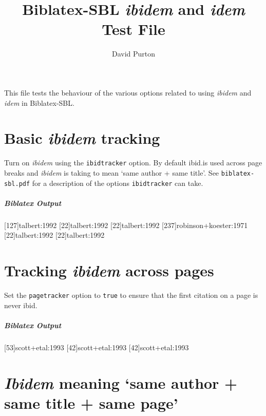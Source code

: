 \documentclass{article}
\newenvironment{biboutput}{%
  \subparagraph{Biblatex Output}
}{\color{black}}
\begin{document}
\title{Biblatex-SBL \emph{ibidem} and \emph{idem} Test File}
\author{David Purton}
\maketitle

This file tests the behaviour of the various options related to using
\emph{ibidem} and \emph{idem} in Biblatex-SBL.

\section*{Basic \emph{ibidem} tracking}

Turn on \emph{ibidem} using the \texttt{ibidtracker} option. By default
ibid.\@ is used across page breaks and \emph{ibidem} is taking to mean ‘same
author + same title’. See \texttt{biblatex-sbl.pdf} for a description of the
options \texttt{ibidtracker} can take.


\begin{biboutput}
  [127]{talbert:1992}
  [22]{talbert:1992}
  [22]{talbert:1992}
  [237]{robinson+koester:1971}
  [22]{talbert:1992}
  \clearpage
  [22]{talbert:1992}
\end{biboutput}

\section*{Tracking \emph{ibidem} across pages}

Set the \texttt{pagetracker} option to \texttt{true} to ensure that the first
citation on a page is never ibid. 


\begin{biboutput}
  [53]{scott+etal:1993}
  [42]{scott+etal:1993}
  \clearpage
  [42]{scott+etal:1993}
\end{biboutput}

\section*{\emph{Ibidem} meaning ‘same author + same title + same page’}
\end{document}
